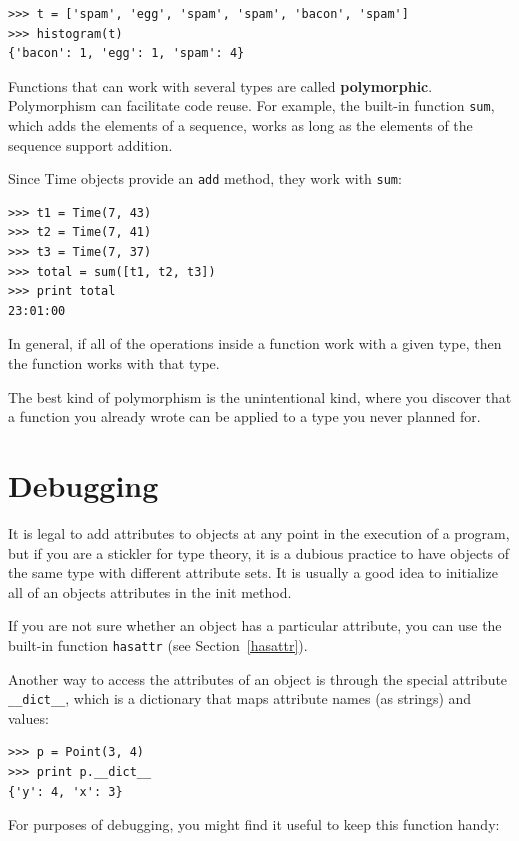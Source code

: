 \documentclass[12pt,a4paper,final,twoside,onecolumn,titlepage]{book}
\begin{document}
\begin{verbatim}
>>> t = ['spam', 'egg', 'spam', 'spam', 'bacon', 'spam']
>>> histogram(t)
{'bacon': 1, 'egg': 1, 'spam': 4}
\end{verbatim}
%
Functions that can work with several types are called {\bf polymorphic}.
Polymorphism can facilitate code reuse.  For example, the built-in
function {\tt sum}, which adds the elements of a sequence, works
as long as the elements of the sequence support addition.

Since Time objects provide an {\tt add} method, they work
with {\tt sum}:

\begin{verbatim}
>>> t1 = Time(7, 43)
>>> t2 = Time(7, 41)
>>> t3 = Time(7, 37)
>>> total = sum([t1, t2, t3])
>>> print total
23:01:00
\end{verbatim}
%
In general, if all of the operations inside a function 
work with a given type, then the function works with that type.

The best kind of polymorphism is the unintentional kind, where
you discover that a function you already wrote can be
applied to a type you never planned for.


\section{Debugging}

It is legal to add attributes to objects at any point in the execution
of a program, but if you are a stickler for type theory, it is a
dubious practice to have objects of the same type with different
attribute sets.  It is usually a good idea to
initialize all of an objects attributes in the init method.

If you are not sure whether an object has a particular attribute, you
can use the built-in function {\tt hasattr} (see Section~\ref{hasattr}).

Another way to access the attributes of an object is through the
special attribute \verb"__dict__", which is a dictionary that maps
attribute names (as strings) and values:

\begin{verbatim}
>>> p = Point(3, 4)
>>> print p.__dict__
{'y': 4, 'x': 3}
\end{verbatim}
%
For purposes of debugging, you might find it useful to keep this
function handy:
\end{document}
